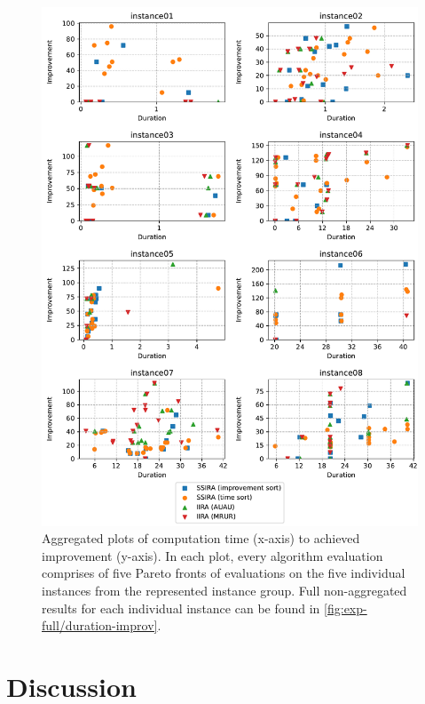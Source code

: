 \begin{figure}[p]
    \centering
    \includegraphics[width=\textwidth]{img/exp_aggregated_duration_improv.pdf}
    \caption{
        Aggregated plots of computation time (x-axis) to achieved improvement (y-axis).
        In each plot, every algorithm evaluation comprises of five Pareto fronts of evaluations
        on the five individual instances from the represented instance group.
        Full non-aggregated results for each individual instance can be found in \cref{fig:exp-full/duration-improv}.
        }
    \label{fig:exp/duration-improv}
\end{figure}

\section{Discussion} \label{sec:numerical-experiments/discussion}

